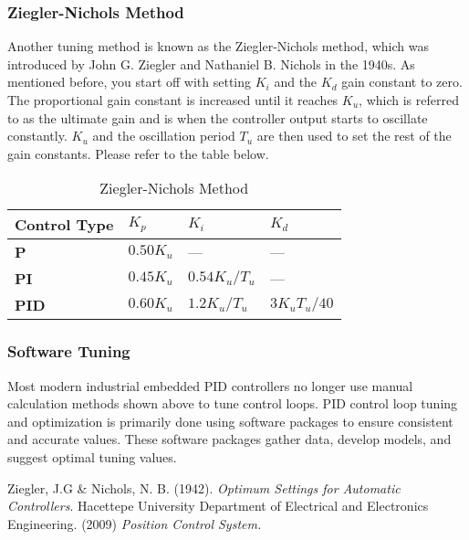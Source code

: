 \documentclass[10pt,conference]{IEEEtran}
\begin{document}
\subsubsection{Ziegler-Nichols Method}

Another tuning method is known as the Ziegler-Nichols method, which was introduced by John
G. Ziegler and Nathaniel B. Nichols in the 1940s. As mentioned before, you start off with
setting \(K_i\) and the \(K_d\) gain constant to zero. The proportional gain constant is
increased until it reaches \(K_u\), which is referred to as the ultimate gain and is when
the controller output starts to oscillate constantly. \(K_u\) and the oscillation period
\(T_u\) are then used to set the rest of the gain constants. Please refer to the table below.

\begin{table}[h]
    \caption{Ziegler-Nichols Method\cite{b1}}
    \begin{center}
        \begin{tabular}{@{}llll@{}}
            \toprule
            \textbf{Control Type} & \(K_p\)     & \(K_i\)         & \(K_d\)        \\ \midrule
            \textbf{P}            & \(0.50K_u\) & ---             & ---            \\
            \textbf{PI}           & \(0.45K_u\) & \(0.54K_u/T_u\) & ---            \\
            \textbf{PID}          & \(0.60K_u\) & \(1.2K_u/T_u\)  & \(3K_uT_u/40\) \\ \bottomrule
        \end{tabular}
    \end{center}
\end{table}

\subsubsection{Software Tuning}

Most modern industrial embedded PID controllers no longer use manual calculation methods
shown above to tune control loops. PID control loop tuning and optimization is primarily
done using software packages to ensure consistent and accurate values. These software
packages gather data, develop models, and suggest optimal tuning values.

\begin{thebibliography}{00}
     Ziegler, J.G \& Nichols, N. B. (1942). \textit{Optimum Settings for Automatic Controllers}.
     Hacettepe University Department of Electrical and Electronics Engineering. (2009) \textit{Position Control System.}
\end{thebibliography}
\end{document}
